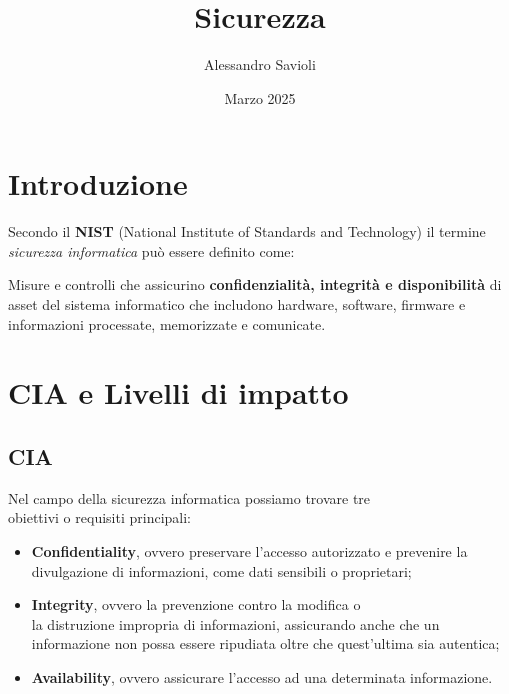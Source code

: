 \documentclass[14pt]{extarticle}
\begin{document}
\title{Sicurezza}
\author{Alessandro Savioli}
\date{Marzo 2025}

\maketitle

\tableofcontents

\newpage

\section{Introduzione}

Secondo il \textbf{NIST} (National Institute of Standards and Technology) il termine
\textit{sicurezza informatica} può essere definito come:

\begin{center}
    Misure e controlli che assicurino \textbf{confidenzialità, integrità e disponibilità} di asset del sistema informatico
    che includono hardware, software, firmware e informazioni processate, memorizzate e comunicate.
\end{center}

\section{CIA e Livelli di impatto}

\subsection{CIA}

Nel campo della sicurezza informatica possiamo trovare tre
\\ obiettivi o requisiti principali:

\begin{itemize}
    \item \textbf{Confidentiality}, ovvero preservare l'accesso autorizzato e prevenire la divulgazione di informazioni, come dati sensibili o proprietari;
    \item \textbf{Integrity}, ovvero la prevenzione contro la modifica o 
    \\ la distruzione impropria di informazioni, assicurando anche che un informazione non possa essere ripudiata oltre che quest'ultima sia autentica;
    \item \textbf{Availability}, ovvero assicurare l'accesso ad una determinata informazione.  
\end{itemize}
\end{document}
